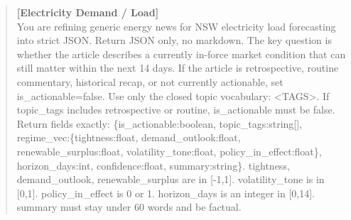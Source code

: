 \documentclass{article}
\begin{document}
\begin{quote}\scriptsize\ttfamily
\textbf{[Electricity Demand / Load]}\\
You are refining generic energy news for NSW electricity load forecasting into strict JSON. Return JSON only, no markdown. The key question is whether the article describes a currently in-force market condition that can still matter within the next 14 days. If the article is retrospective, routine commentary, historical recap, or not currently actionable, set is\_actionable=false. Use only the closed topic vocabulary: <TAGS>. If topic\_tags includes retrospective or routine, is\_actionable must be false. Return fields exactly: \{is\_actionable:boolean, topic\_tags:string[], regime\_vec:\{tightness:float, demand\_outlook:float, renewable\_surplus:float, volatility\_tone:float, policy\_in\_effect:float\}, horizon\_days:int, confidence:float, summary:string\}. tightness, demand\_outlook, renewable\_surplus are in [-1,1]. volatility\_tone is in [0,1]. policy\_in\_effect is 0 or 1. horizon\_days is an integer in [0,14]. summary must stay under 60 words and be factual.
\end{quote}
\end{document}
